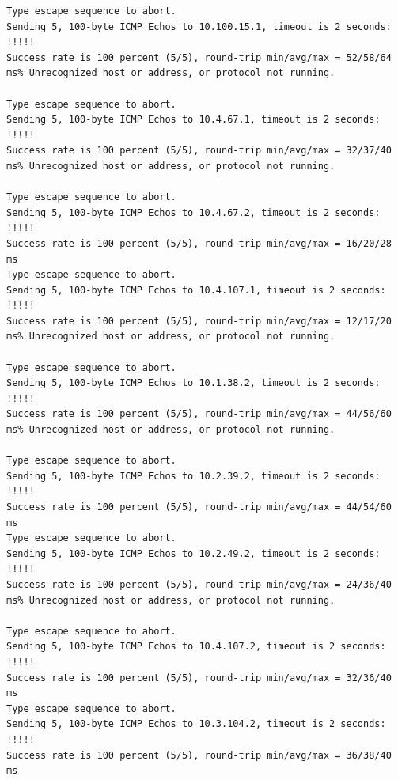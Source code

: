 \documentclass[12pt,twoside,a4paper]{report}
\begin{document}
{\begin{small}
\begin{verbatim}
Type escape sequence to abort.
Sending 5, 100-byte ICMP Echos to 10.100.15.1, timeout is 2 seconds:
!!!!!
Success rate is 100 percent (5/5), round-trip min/avg/max = 52/58/64 ms% Unrecognized host or address, or protocol not running.

Type escape sequence to abort.
Sending 5, 100-byte ICMP Echos to 10.4.67.1, timeout is 2 seconds:
!!!!!
Success rate is 100 percent (5/5), round-trip min/avg/max = 32/37/40 ms% Unrecognized host or address, or protocol not running.

Type escape sequence to abort.
Sending 5, 100-byte ICMP Echos to 10.4.67.2, timeout is 2 seconds:
!!!!!
Success rate is 100 percent (5/5), round-trip min/avg/max = 16/20/28 ms
Type escape sequence to abort.
Sending 5, 100-byte ICMP Echos to 10.4.107.1, timeout is 2 seconds:
!!!!!
Success rate is 100 percent (5/5), round-trip min/avg/max = 12/17/20 ms% Unrecognized host or address, or protocol not running.

Type escape sequence to abort.
Sending 5, 100-byte ICMP Echos to 10.1.38.2, timeout is 2 seconds:
!!!!!
Success rate is 100 percent (5/5), round-trip min/avg/max = 44/56/60 ms% Unrecognized host or address, or protocol not running.

Type escape sequence to abort.
Sending 5, 100-byte ICMP Echos to 10.2.39.2, timeout is 2 seconds:
!!!!!
Success rate is 100 percent (5/5), round-trip min/avg/max = 44/54/60 ms
Type escape sequence to abort.
Sending 5, 100-byte ICMP Echos to 10.2.49.2, timeout is 2 seconds:
!!!!!
Success rate is 100 percent (5/5), round-trip min/avg/max = 24/36/40 ms% Unrecognized host or address, or protocol not running.

Type escape sequence to abort.
Sending 5, 100-byte ICMP Echos to 10.4.107.2, timeout is 2 seconds:
!!!!!
Success rate is 100 percent (5/5), round-trip min/avg/max = 32/36/40 ms
Type escape sequence to abort.
Sending 5, 100-byte ICMP Echos to 10.3.104.2, timeout is 2 seconds:
!!!!!
Success rate is 100 percent (5/5), round-trip min/avg/max = 36/38/40 ms

\end{verbatim}
\end{small}
}
\end{document}
